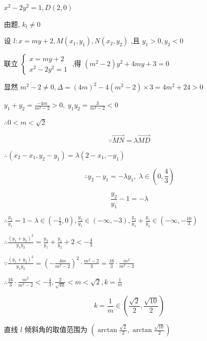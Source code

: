 \documentclass[10pt]{article}
\begin{document}
\({x}^{2} - 2{y}^{2} = 1,D\left( {2,0}\right)\)

由题, \({k}_{l} \neq  0\)

设 \(l : x = {my} + 2,M\left( {{x}_{1},{y}_{1}}\right) ,N\left( {{x}_{2},{y}_{2}}\right)\) ,且 \({y}_{1} > 0,{y}_{2} < 0\)

联立 \(\left\{  \begin{array}{l} x = {my} + 2 \\  {x}^{2} - 2{y}^{2} = 1 \end{array}\right.\) ,得 \(\left( {{m}^{2} - 2}\right) {y}^{2} + {4my} + 3 = 0\)

显然 \({m}^{2} - 2 \neq  0,\Delta  = {\left( 4m\right) }^{2} - 4\left( {{m}^{2} - 2}\right)  \times  3 = 4{m}^{2} + {24} > 0\)

\({y}_{1} + {y}_{2} = \frac{-{4m}}{{m}^{2} - 2} > 0,\;{y}_{1}{y}_{2} = \frac{3}{{m}^{2} - 2} < 0\)

\(\therefore 0 < m < \sqrt{2}\)

\[
\because \overrightarrow{MN} = \lambda \overrightarrow{MD}
\]

\(\therefore \left( {{x}_{2} - {x}_{1},{y}_{2} - {y}_{1}}\right)  = \lambda \left( {2 - {x}_{1}, - {y}_{1}}\right)\)

\[
\therefore {y}_{2} - {y}_{1} =  - \lambda {y}_{1},\;\lambda  \in  \left( {0,\frac{4}{3}}\right)
\]

\[
\frac{{y}_{2}}{{y}_{1}} - 1 =  - \lambda
\]

\(\therefore \frac{{y}_{2}}{{y}_{1}} = 1 - \lambda  \in  \left( {-\frac{1}{3},0}\right) ,\frac{{y}_{2}}{{y}_{1}} \in  \left( {-\infty , - 3}\right) ,\frac{{y}_{2}}{{y}_{1}} + \frac{{y}_{1}}{{y}_{2}} \in  \left( {-\infty , - \frac{10}{3}}\right)\)

\(\therefore \frac{{\left( {y}_{1} + {y}_{2}\right) }^{2}}{{y}_{1}{y}_{2}} = \frac{{y}_{2}}{{y}_{1}} + \frac{{y}_{1}}{{y}_{2}} + 2 <  - \frac{4}{3}\)

\(\because \frac{{\left( {y}_{1} + {y}_{2}\right) }^{2}}{{y}_{1}{y}_{2}} = {\left( -\frac{4m}{{m}^{2} - 2}\right) }^{2} \cdot  \frac{{m}^{2} - 2}{3} = \frac{16}{3} \cdot  \frac{{m}^{2}}{{m}^{2} - 2}\)

\(\therefore \frac{16}{3} \cdot  \frac{{m}^{2}}{{m}^{2} - 2} <  - \frac{4}{3},\frac{2}{\sqrt{10}} < m < \sqrt{2},k = \frac{1}{m}\)

\[
k = \frac{1}{m} \in  \left( {\frac{\sqrt{2}}{2},\frac{\sqrt{10}}{2}}\right)
\]

直线 \(l\) 倾斜角的取值范围为 \(\left( {\arctan \frac{\sqrt{2}}{2},\arctan \frac{\sqrt{10}}{2}}\right)\)
\end{document}

